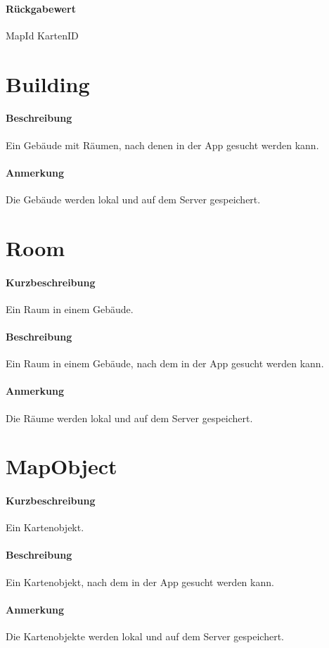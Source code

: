 \paragraph*{Rückgabewert}
MapId KartenID


\section{Building}
\paragraph*{Beschreibung}
Ein Gebäude mit Räumen, nach denen in der App gesucht werden kann.
\paragraph*{Anmerkung}
Die Gebäude werden lokal und auf dem Server gespeichert.


\section{Room}
\paragraph*{Kurzbeschreibung}
Ein Raum in einem Gebäude.
\paragraph*{Beschreibung}
Ein Raum in einem Gebäude, nach dem in der App gesucht werden kann.
\paragraph*{Anmerkung}
Die Räume werden lokal und auf dem Server gespeichert.


\section{MapObject}
\paragraph*{Kurzbeschreibung}
Ein Kartenobjekt.
\paragraph*{Beschreibung}
Ein Kartenobjekt, nach dem in der App gesucht werden kann.
\paragraph*{Anmerkung}
Die Kartenobjekte werden lokal und auf dem Server gespeichert.

